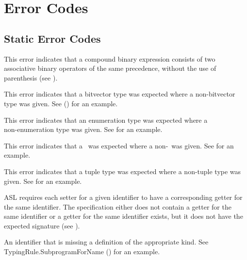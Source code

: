 \chapter{Error Codes}

\section{Static Error Codes}
\begin{description}
\hypertarget{def-binopprecedence}{}
\item[$\BinopPrecedence$]
This error indicates that a compound binary expression consists of two associative binary
operators of the same precedence, without the use of parenthesis (see ).

\hypertarget{def-expectedbitvectortype}{}
\item[$\ExpectedBitvectorType$]
This error indicates that a bitvector type was expected where a non-bitvector type was given.
See  () for an example.

\hypertarget{def-expectedenumerationtype}{}
\item[$\ExpectedEnumerationType$]
This error indicates that an enumeration type was expected where a \\
non-enumeration type was given.
See  for an example.

\hypertarget{def-expectedstructuredtype}{}
\item[$\ExpectedStructuredType$]
This error indicates that a \structuredtype\ was expected where a non-\structuredtype\ was given.
See  for an example.

\hypertarget{def-expectedtupletype}{}
\item[$\ExpectedTupleType$]
This error indicates that a tuple type was expected where a non-tuple type was given.
See  for an example.

\hypertarget{def-setterwithoutgetter}{}
\item[$\SetterWithoutGetter$:]
ASL requires each setter for a given identifier to have a corresponding getter for the same
identifier.
The specification either does not contain a getter for the same identifier
or a getter for the same identifier exists, but it does not have the expected
signature (see ).

\hypertarget{def-undefinedidentifier}{}
\item[$\UndefinedIdentifier$]
An identifier that is missing a definition of the appropriate kind.
See TypingRule.SubprogramForName () for an example.


\end{description}
